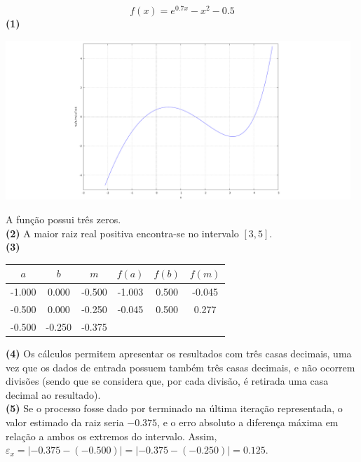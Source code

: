 \begin{equation*}
	f(x)=e^{0.7x}-x^2-0.5
\end{equation*}
\textbf{(1)}
\begin{center} \includegraphics[height=60mm,keepaspectratio]{DESC1T1-1-1} \end{center}
A função possui três zeros.\\
\textbf{(2)} A maior raiz real positiva encontra-se no intervalo $[3,5]$.\\
\textbf{(3)}
\begin{center}
\begin{tabular}{c c c | c c c}
	$a$    & $b$    & $m$    & $f(a)$ & $f(b)$ & $f(m)$ \\ \hline
	-1.000 & 0.000  & -0.500 & -1.003 & 0.500  & -0.045 \\
	-0.500 & 0.000  & -0.250 & -0.045 & 0.500  & 0.277  \\
	-0.500 & -0.250 & -0.375 &        &        &
\end{tabular}
\end{center}
\textbf{(4)} Os cálculos permitem apresentar os resultados com três casas decimais, uma vez que os dados de entrada possuem também três casas decimais, e não ocorrem divisões (sendo que se considera que, por cada divisão, é retirada uma casa decimal ao resultado).\\
\textbf{(5)} Se o processo fosse dado por terminado na última iteração representada, o valor estimado da raiz seria $-0.375$, e o erro absoluto a diferença máxima em relação a ambos os extremos do intervalo. Assim, $\varepsilon_x=|-0.375-(-0.500)|=|-0.375-(-0.250)|=0.125$.

